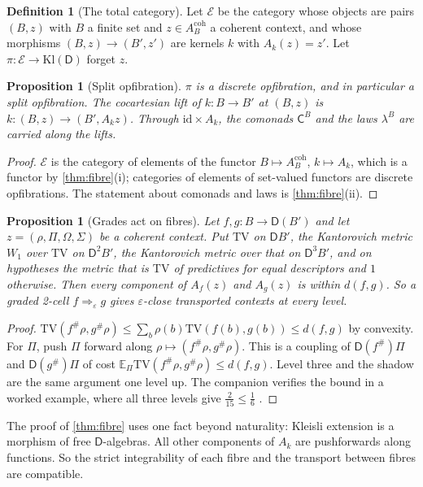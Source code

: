 \documentclass[11pt]{article}
\newtheorem{proposition}[theorem]{Proposition}
\theoremstyle{definition}
\newtheorem{definition}[theorem]{Definition}
\theoremstyle{remark}
\newcommand{\D}{\mathsf{D}}
\newcommand{\Kl}{\mathrm{Kl}}
\newcommand{\TV}{\mathrm{TV}}
\newcommand{\C}{\mathsf{C}}
\newcommand{\id}{\mathrm{id}}
\begin{document}
\begin{definition}[The total category]\label{def:total}
Let $\mathcal E$ be the category whose objects are pairs $(B,z)$ with $B$ a finite set and $z\in A_B^{\mathrm{coh}}$ a
coherent context, and whose morphisms $(B,z)\to(B',z')$ are kernels $k$ with $A_k(z)=z'$. Let $\pi\colon\mathcal E\to\Kl(\D)$
forget $z$.
\end{definition}

\begin{proposition}[Split opfibration]\label{prop:opfib}
$\pi$ is a discrete opfibration, and in particular a split opfibration. The cocartesian lift of $k\colon B\to B'$ at
$(B,z)$ is $k\colon(B,z)\to(B',A_kz)$. Through $\id\times A_k$, the comonads $\C^B$ and the laws $\lambda^B$ are carried
along the lifts.
\end{proposition}
\begin{proof}
$\mathcal E$ is the category of elements of the functor $B\mapsto A^{\mathrm{coh}}_B$, $k\mapsto A_k$, which is a functor by
\cref{thm:fibre}(i); categories of elements of set-valued functors are discrete opfibrations. The statement about
comonads and laws is \cref{thm:fibre}(ii).
\end{proof}

\begin{proposition}[Grades act on fibres]\label{prop:gradefibre}
Let $f,g\colon B\to\D(B')$ and let $z=(\rho,\Pi,\Omega,\Sigma)$ be a coherent context. Put $\mathrm{TV}$ on $\D B'$, the
Kantorovich metric $W_1$ over $\mathrm{TV}$ on $\D^2B'$, the Kantorovich metric over that on $\D^3B'$, and on hypotheses the
metric that is $\TV$ of predictives for equal descriptors and $1$ otherwise. Then every component of $A_f(z)$ and
$A_g(z)$ is within $d(f,g)$. So a graded 2-cell $f\Rightarrow_\varepsilon g$ gives $\varepsilon$-close transported contexts at
every level.
\end{proposition}
\begin{proof}
$\TV(f^\#\rho,g^\#\rho)\le\sum_b\rho(b)\TV(f(b),g(b))\le d(f,g)$ by convexity. For $\Pi$, push $\Pi$ forward along
$\rho\mapsto(f^\#\rho,g^\#\rho)$. This is a coupling of $\D(f^\#)\Pi$ and $\D(g^\#)\Pi$ of cost $\mathbb E_\Pi\TV(f^\#\rho,g^\#\rho)\le d(f,g)$.
Level three and the shadow are the same argument one level up. The companion verifies the bound in a worked
example, where all three levels give $\tfrac2{15}\le\tfrac16$ \cite[\S11]{Awasthi-Family}.
\end{proof}

The proof of \cref{thm:fibre} uses one fact beyond naturality: Kleisli extension is a morphism of free
$\D$-algebras. All other components of $A_k$ are pushforwards along functions. So the strict integrability of
each fibre and the transport between fibres are compatible.
\end{document}

